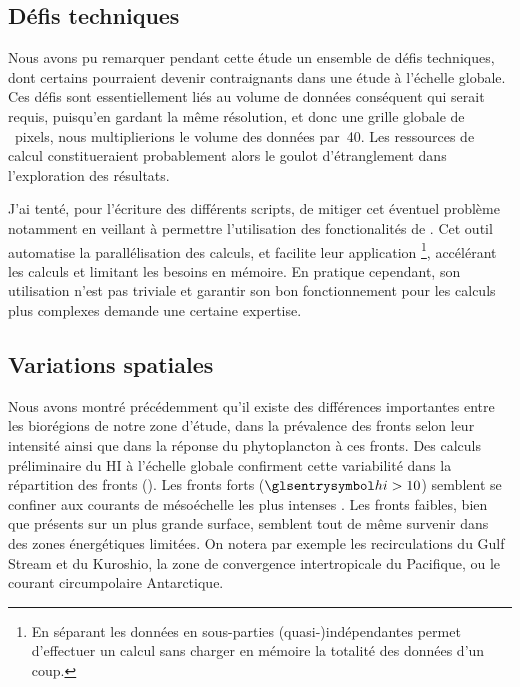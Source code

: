 \subsection{Défis techniques}

Nous avons pu remarquer pendant cette étude un ensemble de défis techniques, dont certains pourraient devenir contraignants dans une étude à l'échelle globale.
Ces défis sont essentiellement liés au volume de données conséquent qui serait requis, puisqu'en gardant la même résolution, et donc une grille globale de ~pixels, nous multiplierions le volume des données par~40.
Les ressources de calcul constitueraient probablement alors le goulot d'étranglement dans l'exploration des résultats.

J'ai tenté, pour l'écriture des différents scripts, de mitiger cet éventuel problème notamment en veillant à permettre l'utilisation des fonctionalités de .
Cet outil automatise la parallélisation des calculs, et facilite leur application \footnote{%
  En séparant les données en sous-parties (quasi-)indépendantes  permet d'effectuer un calcul sans charger en mémoire la totalité des données d'un coup.
}, accélérant les calculs et limitant les besoins en mémoire.
En pratique cependant, son utilisation n'est pas triviale et garantir son bon fonctionnement pour les calculs plus complexes demande une certaine expertise.


\subsection{Variations spatiales}

Nous avons montré précédemment qu'il existe des différences importantes entre les biorégions de notre zone d'étude, dans la prévalence des fronts selon leur intensité ainsi que dans la réponse du phytoplancton à ces fronts.
Des calculs préliminaire du HI à l'échelle globale confirment cette variabilité dans la répartition des fronts ().
Les fronts forts (\(\am{hi}>10\)) semblent se confiner aux courants de mésoéchelle les plus intenses .
Les fronts faibles, bien que présents sur un plus grande surface, semblent tout de même survenir dans des zones énergétiques limitées.
On notera par exemple les recirculations du Gulf Stream et du Kuroshio, la zone de convergence intertropicale du Pacifique, ou le courant circumpolaire Antarctique.

